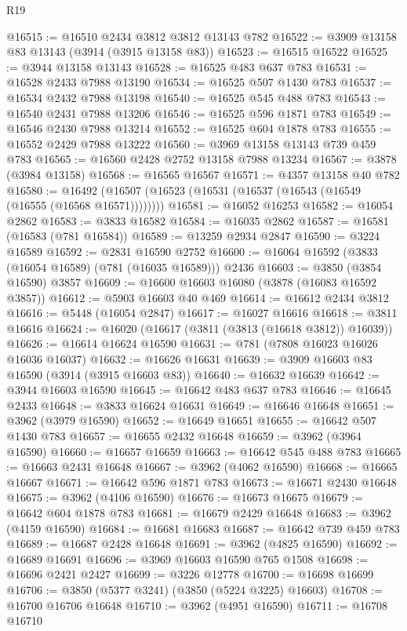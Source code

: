 \begin{lexlean}{R19}
\begin{coremodule}
@16515 := @16510 @2434 @3812 @3812 @13143 @782
@16522 := @3909 @13158 @83 @13143 (@3914 (@3915 @13158 @83))
@16523 := @16515 @16522
@16525 := @3944 @13158 @13143
@16528 := @16525 @483 @637 @783
@16531 := @16528 @2433 @7988 @13190
@16534 := @16525 @507 @1430 @783
@16537 := @16534 @2432 @7988 @13198
@16540 := @16525 @545 @488 @783
@16543 := @16540 @2431 @7988 @13206
@16546 := @16525 @596 @1871 @783
@16549 := @16546 @2430 @7988 @13214
@16552 := @16525 @604 @1878 @783
@16555 := @16552 @2429 @7988 @13222
@16560 := @3969 @13158 @13143 @739 @459 @783
@16565 := @16560 @2428 @2752 @13158 @7988 @13234
@16567 := @3878 (@3984 @13158)
@16568 := @16565 @16567
@16571 := @4357 @13158 @40 @782
@16580 := @16492 (@16507 (@16523 (@16531 (@16537 (@16543 (@16549 (@16555 (@16568 @16571))))))))
@16581 := @16052 @16253
@16582 := @16054 @2862
@16583 := @3833 @16582
@16584 := @16035 @2862
@16587 := @16581 (@16583 (@781 @16584))
@16589 := @13259 @2934 @2847
@16590 := @3224 @16589
@16592 := @2831 @16590 @2752
@16600 := @16064 @16592 (@3833 (@16054 @16589) (@781 (@16035 @16589))) @2436
@16603 := @3850 (@3854 @16590) @3857
@16609 := @16600 @16603 @16080 (@3878 (@16083 @16592 @3857))
@16612 := @5903 @16603 @40 @469
@16614 := @16612 @2434 @3812
@16616 := @5448 (@16054 @2847)
@16617 := @16027 @16616
@16618 := @3811 @16616
@16624 := @16020 (@16617 (@3811 (@3813 (@16618 @3812)) @16039))
@16626 := @16614 @16624 @16590
@16631 := @781 (@7808 @16023 @16026 @16036 @16037)
@16632 := @16626 @16631
@16639 := @3909 @16603 @83 @16590 (@3914 (@3915 @16603 @83))
@16640 := @16632 @16639
@16642 := @3944 @16603 @16590
@16645 := @16642 @483 @637 @783
@16646 := @16645 @2433
@16648 := @3833 @16624 @16631
@16649 := @16646 @16648
@16651 := @3962 (@3979 @16590)
@16652 := @16649 @16651
@16655 := @16642 @507 @1430 @783
@16657 := @16655 @2432 @16648
@16659 := @3962 (@3964 @16590)
@16660 := @16657 @16659
@16663 := @16642 @545 @488 @783
@16665 := @16663 @2431 @16648
@16667 := @3962 (@4062 @16590)
@16668 := @16665 @16667
@16671 := @16642 @596 @1871 @783
@16673 := @16671 @2430 @16648
@16675 := @3962 (@4106 @16590)
@16676 := @16673 @16675
@16679 := @16642 @604 @1878 @783
@16681 := @16679 @2429 @16648
@16683 := @3962 (@4159 @16590)
@16684 := @16681 @16683
@16687 := @16642 @739 @459 @783
@16689 := @16687 @2428 @16648
@16691 := @3962 (@4825 @16590)
@16692 := @16689 @16691
@16696 := @3969 @16603 @16590 @765 @1508
@16698 := @16696 @2421 @2427
@16699 := @3226 @12778
@16700 := @16698 @16699
@16706 := @3850 (@5377 @3241) (@3850 (@5224 @3225) @16603)
@16708 := @16700 @16706 @16648
@16710 := @3962 (@4951 @16590)
@16711 := @16708 @16710

\end{coremodule}
\end{lexlean}
